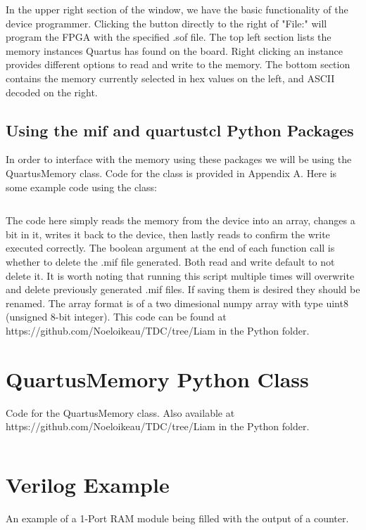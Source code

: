 \documentclass[letter,12pt]{article}
\begin{document}
In the upper right section of the window, we have the basic functionality of the device programmer. Clicking the button directly to the right of "File:" will program the FPGA with the specified .sof file. The top left section lists the memory instances Quartus has found on the board. Right clicking an instance provides different options to read and write to the memory. The bottom section contains the memory currently selected in hex values on the left, and ASCII decoded on the right.

\subsection{Using the mif and quartustcl Python Packages}

In order to interface with the memory using these packages we will be using the QuartusMemory class. Code for the class is provided in Appendix A. Here is some example code using the class:

\begin{mdframed}
\inputminted[linenos=true,breaklines,breakanywhere=true]{python}{../../Python/memoryExample.py}
\end{mdframed}

The code here simply reads the memory from the device into an array, changes a bit in it, writes it back to the device, then lastly reads to confirm the write executed correctly. The boolean argument at the end of each function call is whether to delete the .mif file generated. Both read and write default to not delete it. It is worth noting that running this script multiple times will overwrite and delete previously generated .mif files. If saving them is desired they should be renamed. The array format is of a two dimesional numpy array with type uint8 (unsigned 8-bit integer). 
This code can be found at https://github.com/Noeloikeau/TDC/tree/Liam in the Python folder.

\newpage
\appendix

\section{QuartusMemory Python Class}

Code for the QuartusMemory class. Also available at \\ https://github.com/Noeloikeau/TDC/tree/Liam in the Python folder.

\begin{mdframed}
\inputminted[linenos=true,breaklines,breakanywhere=true]{python}{../../Python/QuartusMemory.py}
\end{mdframed}

\section{Verilog Example}
An example of a 1-Port RAM module being filled with the output of a counter.

\begin{mdframed}
\inputminted[linenos=true,breaklines,breakanywhere=true]{verilog}{memExample.v}
\end{mdframed}
\end{document}
